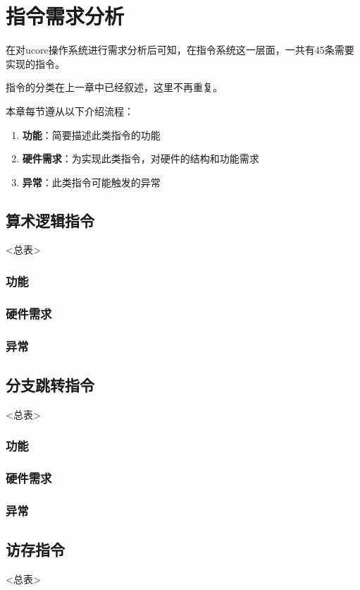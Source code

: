 \chapter{指令需求分析}

在对ucore操作系统进行需求分析后可知，在指令系统这一层面，一共有45条需要实现的指令。

指令的分类在上一章中已经叙述，这里不再重复。

本章每节遵从以下介绍流程：
\begin{enumerate}
    \item {\bf 功能}：简要描述此类指令的功能
    \item {\bf 硬件需求}：为实现此类指令，对硬件的结构和功能需求
    \item {\bf 异常}：此类指令可能触发的异常
\end{enumerate}

\section{算术逻辑指令}
<总表>
    \subsection{功能}
    \subsection{硬件需求}
    \subsection{异常}

\section{分支跳转指令}
<总表>
    \subsection{功能}
    \subsection{硬件需求}
    \subsection{异常}

\section{访存指令}
<总表>
